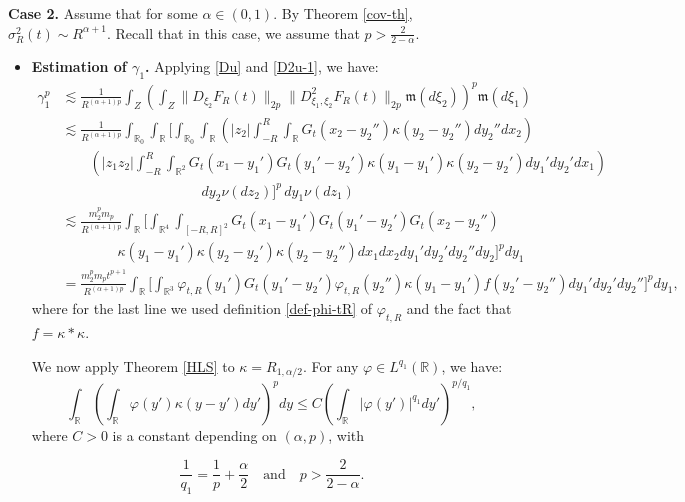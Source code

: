 \documentclass[12pt]{article}
\def\bR{\mathbb{R}}
\newcommand{\les}{\lesssim}
\def\k{\kappa}
\newcommand{\fm}{\mathfrak{m}}
\begin{document}
\medskip


{\bf Case 2.} Assume that  for some $\alpha \in (0,1)$. By Theorem \ref{cov-th}, $\sigma_R^2(t) \sim  R^{\alpha+1}$. 
Recall that in this case, we assume that 
$p>\frac{2}{2-\alpha}$.

\begin{itemize}

\item {\bf Estimation of $\gamma_1$.} Applying \eqref{Du} and \eqref{D2u-1}, we have:
\begin{align*}
\gamma_1^p & \les \frac{1}{R^{(\alpha+1)p}} \int_Z \left( \int_Z \|D_{\xi_2}F_R(t) \|_{2p}
\|D^2_{\xi_1,\xi_2} F_R(t) \|_{2p}\fm(d\xi_2)\right)^{p}\fm(d\xi_1)\\
& \les \frac{1}{R^{(\alpha+1)p}} \int_{\bR_0}\int_{\bR}  \Bigg[ \int_{\bR_0} \int_{\bR}  \left(|z_2| \int_{-R}^R \int_{\bR} G_t(x_2-y_2'') \k(y_2-y_2'') dy_2'' dx_2\right) \\
& \quad \quad
\left(|z_1 z_2| \int_{-R}^R \int_{\bR^2} G_t(x_1-y_1')G_t(y_1'-y_2') \k(y_1-y_1')\k(y_2-y_2') dy_1' dy_2' dx_1 \right) \\
& \qquad \qquad \qquad \qquad \qquad  dy_2 \nu(dz_2)\Bigg]^{p} \, dy_1 \nu(dz_1)\\
& \les \frac{m_2^p m_p}{R^{(\alpha+1)p}} \int_{\bR} \Bigg[ \int_{\bR^4} \int_{[-R,R]^2} G_t(x_1-y_1') G_t(y_1'-y_2') G_t(x_2-y_2'') \\
& \quad \quad \quad \quad \k(y_1-y_1') \k(y_2-y_2') \k(y_2-y_2'') dx_1 dx_2 dy_1' dy_2' dy_2''  dy_2\Bigg]^p dy_1\\
& = \frac{m_2^p m_pt^{p+1}}{R^{(\alpha+1)p}} \int_{\bR} \Bigg[ \int_{\bR^3} \varphi_{t,R}(y_1') G_t(y_1'-y_2') \varphi_{t,R}(y_2'') \k(y_1-y_1') f(y_2'-y_2'') dy_1' dy_2' dy_2'' \Bigg]^p dy_1,
\end{align*}
where for the last line we used definition \eqref{def-phi-tR} of $\varphi_{t,R}$ and the fact that $f=\k *\k$.

We now apply Theorem \ref{HLS} to $\k=R_{1,\alpha/2}$. For any $\varphi \in L^{q_1}(\bR)$, we have:
\begin{equation}
\label{HLS-gam1}
\int_{\bR} \left( \int_{\bR} \varphi(y')\k(y-y')dy'\right)^p dy \leq C \left(\int_{\bR} |\varphi(y')|^{q_1}dy' \right)^{p/q_1},
\end{equation}
where $C>0$ is a constant depending on $(\alpha,p)$, with

\begin{equation}
\label{def-q1}
\frac{1}{q_1}=\frac{1}{p}+\frac{\alpha}{2} \quad \mbox{and} \quad p>\frac{2}{2-\alpha}.
\end{equation} 


\end{itemize}
\end{document}
